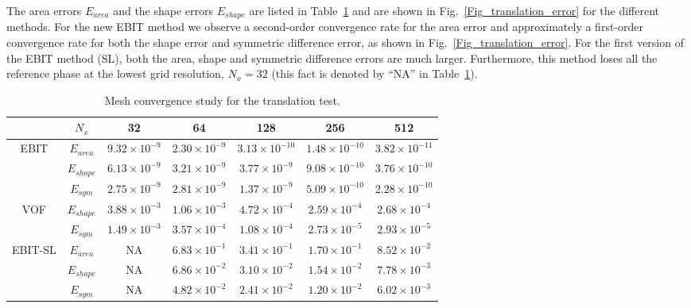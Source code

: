 The area errors $E_{area}$ and the shape errors $E_{shape}$ are listed in Table~\ref{Tab_translation_error} and are shown in Fig.~\ref{Fig_translation_error} for the different methods. 
For the new EBIT method we observe a second-order convergence rate for the area error and approximately a first-order convergence rate for both the shape error and symmetric difference error, as shown in Fig.~\ref{Fig_translation_error}. For the first version of the EBIT method (SL), both the area, shape and symmetric difference errors are much larger. Furthermore, this method loses all the reference phase at the lowest grid resolution, $N_x = 32$ (this fact is denoted by ``NA'' in Table~\ref{Tab_translation_error}). 

\begin{table}[hbt!]
\footnotesize
\caption{Mesh convergence study for the translation test.}
\centering
\begin{tabular}{cc|ccccc}
\hline 
 &$N_x$ &32 & 64 & 128 & 256 & 512\\ 
\hline 
EBIT&$E_{area}$ & $9.32\times 10^{-9}$ & $2.30\times 10^{-9}$ & $3.13\times 10^{-10}$ & $1.48\times 10^{-10}$ & $3.82\times 10^{-11}$\\ 
&$E_{shape}$ & $6.13\times 10^{-9}$ & $3.21\times 10^{-9}$ & $3.77 \times 10^{-9}$ & $9.08 \times 10^{-10}$ & $3.76\times 10^{-10}$\\
&$E_{sym}$ & $2.75\times 10^{-9}$ & $2.81\times 10^{-9}$ & $1.37 \times 10^{-9}$ & $5.09 \times 10^{-10}$ & $2.28\times 10^{-10}$\\
\hline 
VOF&$E_{shape}$ & $3.88\times 10^{-3}$ & $1.06\times 10^{-3}$ & $4.72 \times 10^{-4}$ & $2.59 \times 10^{-4}$ & $2.68\times 10^{-4}$\\
&$E_{sym}$ & $1.49\times 10^{-3}$ & $3.57\times 10^{-4}$ & $1.08 \times 10^{-4}$ & $2.73 \times 10^{-5}$ & $2.93\times 10^{-5}$\\
\hline 
EBIT-SL&$E_{area}$ & NA & $6.83\times 10^{-1}$ & $3.41\times 10^{-1}$ & $1.70\times 10^{-1}$ & $8.52\times 10^{-2}$\\ 
&$E_{shape}$ & NA & $6.86\times 10^{-2}$ & $3.10 \times 10^{-2}$ & $1.54 \times 10^{-2}$ & $7.78\times 10^{-3}$\\
&$E_{sym}$ & NA & $4.82\times 10^{-2}$ & $2.41 \times 10^{-2}$ & $1.20 \times 10^{-2}$ & $6.02\times 10^{-3}$\\
\hline 
\end{tabular}
\label{Tab_translation_error}
\normalsize
\end{table}

